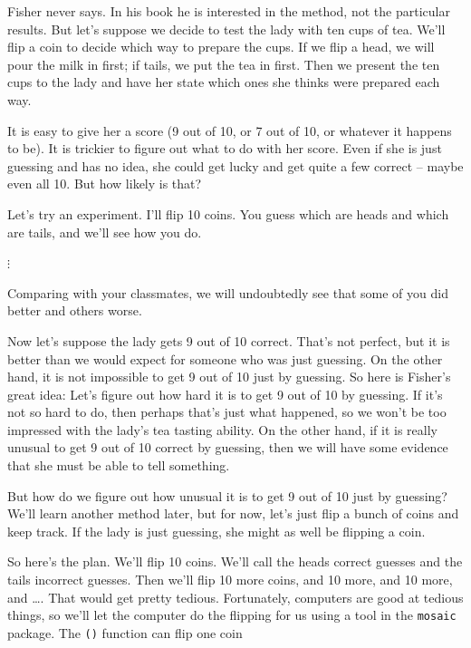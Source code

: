 \documentclass[twoside]{book}\usepackage[]{graphicx}\usepackage[]{xcolor}
\newcommand{\Rindex}[1]{\index{\texttt{#1}}}
\newcommand{\function}[1]{{\color{purple!75!blue}\texttt{\StrSubstitute{#1}{()}{}()}}\Rindex{#1}}
\newcommand{\pkg}[1]{{\color{red!80!black}\texttt{#1}}\Rindex{#1}}
\def\R{{\sf R}}
\begin{document}
Fisher never says.  In his book he is interested in the method, not the 
particular results.  But let's suppose we decide to test the lady with
ten cups of tea.  
We'll flip a coin to decide which way to prepare the cups.  
If we flip a head, we will pour the milk in first; if tails, we 
put the tea in first.
Then we present the ten cups to the lady and have her state which ones she
thinks were prepared each way.  

It is easy to give her a score (9 out of 10, or 7 out of 10, or whatever
it happens to be).  It is trickier to figure out what to do with her score.
Even if she is just guessing and has no idea, she could get lucky and 
get quite a few correct -- maybe even all 10.  But how likely is that?

Let's try an experiment.  I'll flip 10 coins.  You guess which are heads and
which are tails, and we'll see how you do.  

$\vdots$

Comparing with your classmates, we will undoubtedly see that some 
of you did better and others worse.

Now let's suppose the lady gets 9 out of 10 correct.  That's not perfect,
but it is better than we would expect for someone who was just guessing.
On the other hand, it is not impossible to get 9 out of 10 just by guessing.
So here is Fisher's great idea:  Let's figure out how hard it is to get
9 out of 10 by guessing.  If it's not so hard to do, then perhaps that's 
just what happened, so we won't be too impressed with the lady's tea tasting
ability.  On the other hand, if it is really unusual to get 9 out of 10 
correct by guessing, then we will have some evidence that she must 
be able to tell something.

But how do we figure out how unusual it is to get 9 out of 10 just by 
guessing?  We'll learn another method later, but for now, let's just 
flip a bunch of coins and keep track.  If the lady is just guessing, she 
might as well be flipping a coin.

So here's the plan.  We'll flip 10 coins.  We'll call the heads correct 
guesses and the tails incorrect guesses.  Then we'll flip 10 more coins,
and 10 more, and 10 more, and \dots.  That would get pretty tedious.
Fortunately, computers are good at tedious things, so we'll let the computer 
do the flipping for us using a tool in the \pkg{mosaic} package.
The \function{rflip()} function can flip one coin
\end{document}
